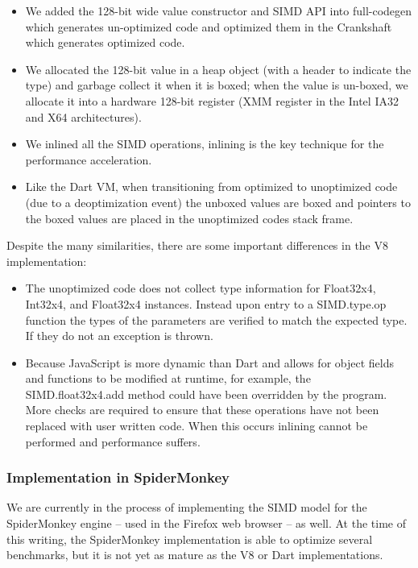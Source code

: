 \documentclass[preprint]{sigplanconf}
\begin{document}
\begin{itemize}
\item
We added the 128-bit wide value constructor and SIMD API into full-codegen which
generates un-optimized code and optimized them in the Crankshaft which generates
optimized code.

\item
We allocated the 128-bit value in a heap object (with a header to indicate the
type) and garbage collect it when it is boxed; when the value is un-boxed, we
allocate it into a hardware 128-bit register (XMM register in the Intel IA32 and
X64 architectures).

\item
We inlined all the SIMD operations, inlining is the key technique for the
performance acceleration.

\item
Like the Dart VM, when transitioning from optimized to unoptimized code (due to
a deoptimization event) the unboxed values are boxed and pointers to the boxed
values are placed in the unoptimized codes stack frame.

\end{itemize}

Despite the many similarities, there are some important differences in the V8 implementation:

\begin{itemize}
\item
The unoptimized code does not collect type information for Float32x4, Int32x4,
and Float32x4 instances. Instead upon entry to a SIMD.type.op function the types
of the parameters are verified to match the expected type. If they do not an
exception is thrown.

\item
Because JavaScript is more dynamic than Dart and allows for object fields and
functions to be modified at runtime, for example, the SIMD.float32x4.add method
could have been overridden by the program. More checks are required to ensure
that these operations have not been replaced with user written code. When this
occurs inlining cannot be performed and performance suffers.
\end{itemize}

\subsubsection{Implementation in SpiderMonkey}

We are currently in the process of implementing the SIMD model for the
SpiderMonkey engine -- used in the Firefox web browser -- as well. At
the time of this writing, the SpiderMonkey implementation is able to
optimize several benchmarks, but it is not yet as mature as the V8 or
Dart implementations.
\end{document}
